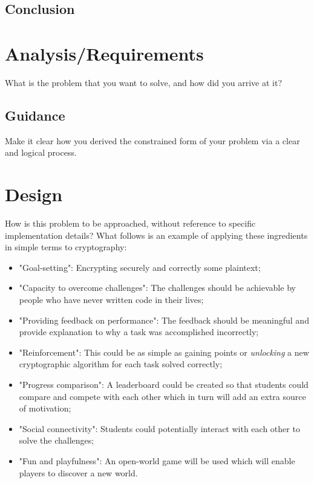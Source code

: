 \documentclass{l4proj}
\begin{document}
\section{Conclusion}

\chapter{Analysis/Requirements}
What is the problem that you want to solve, and how did you arrive at it?
\section{Guidance}
Make it clear how you derived the constrained form of your problem via a clear and logical process. 

\chapter{Design}
How is this problem to be approached, without reference to specific implementation details? 
What follows is an example of applying these ingredients in simple terms to cryptography:
\begin{itemize}
    \item "Goal-setting": Encrypting securely and correctly some plaintext;
    \item "Capacity to overcome challenges": The challenges should be achievable by people who have never written code in their lives;
    \item "Providing feedback on performance": The feedback should be meaningful and provide explanation to why a task was accomplished incorrectly;
    \item "Reinforcement": This could be as simple as gaining points or \textit{unlocking} a new cryptographic algorithm for each task solved correctly;
    \item "Progress comparison": A leaderboard could be created so that students could compare and compete with each other which in turn will add an extra source of motivation;
    \item "Social connectivity": Students could potentially interact with each other to solve the challenges;
    \item "Fun and playfulness": An open-world game will be used which will enable players to discover a new world.
\end{itemize}
\end{document}
